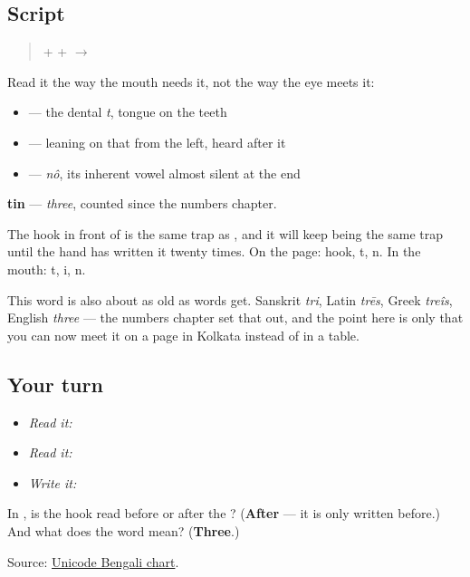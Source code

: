 \subsection*{Script}
\begin{quote}
\textbf{} + \textbf{} + \textbf{} $\to$ \textbf{}
\end{quote}

Read it the way the mouth needs it, not the way the eye meets it:

\begin{itemize}
\raggedright
  \item \textbf{} — the dental \emph{t}, tongue on the teeth
  \item \textbf{} — leaning on that \textbf{} from the left, heard after it
  \item \textbf{} — \emph{nô}, its inherent vowel almost silent at the end
\end{itemize}

\textbf{tin} — \emph{three}, counted since the numbers chapter.

The hook in front of \textbf{} is the same trap as \textbf{}, and it will keep being the same trap until the hand has written it twenty times. On the page: hook, t, n. In the mouth: t, i, n.

This word is also about as old as words get. Sanskrit \emph{tri}, Latin \emph{trēs}, Greek \emph{treîs}, English \emph{three} — the numbers chapter set that out, and the point here is only that you can now meet it on a page in Kolkata instead of in a table.

\subsection*{Your turn}
\begin{itemize}
\raggedright
  \item \emph{Read it:} 
  \item \emph{Read it:} 
  \item \emph{Write it:} 
\end{itemize}

\begin{tcolorbox}[breakable,colback=teal!4,colframe=teal!35!black,title={Before you move on}]
In \textbf{}, is the hook read before or after the \textbf{}? (\textbf{After} — it is only written before.) And what does the word mean? (\textbf{Three}.)

Source: \href{https://www.unicode.org/charts/PDF/U0980.pdf}{Unicode Bengali chart}.
\end{tcolorbox}
